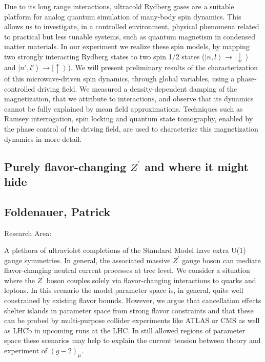 \noindent Due to its long range interactions, ultracold Rydberg gases are a suitable platform
for analog quantum simulation of many-body spin dynamics. This allows us to investigate,
in a controlled environment, physical phenomena related to practical but less tunable systems,
such as quantum magnetism in condensed matter materials.
In our experiment we realize these spin models, by mapping two strongly interacting Rydberg states
to two spin 1/2 states ($\left| n,l \right\rangle  \rightarrow \left| \downarrow \right\rangle$ and
$\left| n',l' \right\rangle  \rightarrow \left| \uparrow \right\rangle$).
We will present preliminary results of the characterization of this microwave-driven spin dynamics,
through global variables, using a phase-controlled driving field. We measured a density-dependent damping
of the magnetization, that we attribute to interactions, and observe that its dynamics cannot
be fully explained by mean field approximations. Techniques such as Ramsey interrogation, spin locking and quantum state
tomography, enabled by the phase control of the driving field, are used to
characterize this magnetization dynamics in more detail.


\newpage
\subsection*{\centering \large Purely flavor-changing $Z^\prime$ and where it might hide}
\subsection*{\centering \normalsize Foldenauer, Patrick}
Research Area: \newline

\noindent A plethora of ultraviolet completions of the Standard Model have extra U(1) gauge symmetries. In general, the associated massive $Z^\prime$ gauge boson can mediate flavor-changing neutral current processes at tree level. We consider a situation where the $Z^\prime$ boson couples solely via flavor-changing interactions to quarks and leptons. In this scenario the model parameter space is, in general, quite well constrained by existing flavor bounds. However, we argue that cancellation effects shelter islands in parameter space from strong flavor constraints and that these can be probed by multi-purpose collider experiments like ATLAS or CMS as well as LHCb in upcoming runs at the LHC. In still allowed regions of parameter space these scenarios may help to explain the current tension between theory and experiment of $(g-2)_\mu$.

